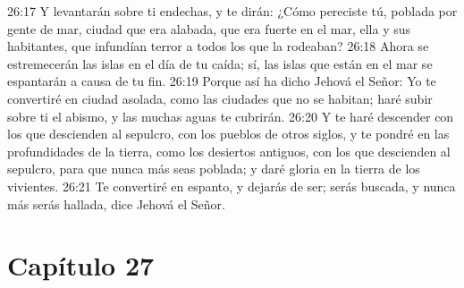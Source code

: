 26:17 Y levantarán sobre ti endechas, y te dirán: ¿Cómo pereciste tú, poblada por gente de mar, ciudad que era alabada, que era fuerte en el mar, ella y sus habitantes, que infundían terror a todos los que la rodeaban?   
26:18 Ahora se estremecerán las islas en el día de tu caída; sí, las islas que están en el mar se espantarán a causa de tu fin. 
26:19 Porque así ha dicho Jehová el Señor: Yo te convertiré en ciudad asolada, como las ciudades que no se habitan; haré subir sobre ti el abismo, y las muchas aguas te cubrirán.   
26:20 Y te haré descender con los que descienden al sepulcro, con los pueblos de otros siglos, y te pondré en las profundidades de la tierra, como los desiertos antiguos, con los que descienden al sepulcro, para que nunca más seas poblada; y daré gloria en la tierra de los vivientes.   
26:21 Te convertiré en espanto, y dejarás de ser; serás buscada, y nunca más serás hallada, dice Jehová el Señor. 

\section*{Capítulo 27 } 
  
